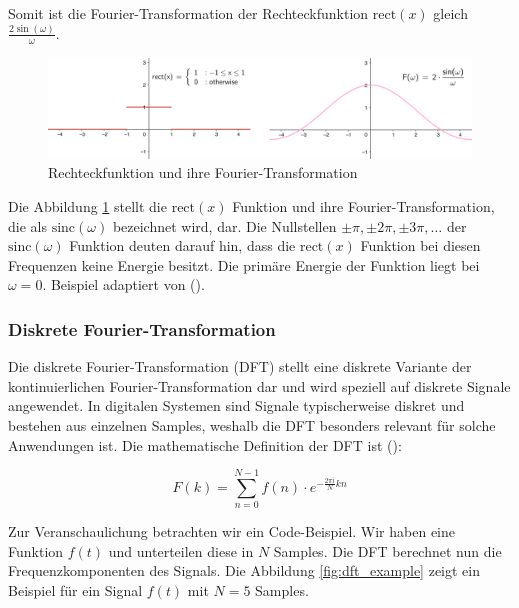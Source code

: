 \documentclass[11pt,a4paper]{article}
\begin{document}
\noindent
\newline
Somit ist die Fourier-Transformation der Rechteckfunktion \( \text{rect}(x) \) gleich
\( \displaystyle\frac{2 \sin(\omega)}{\omega} \).

\begin{figure}[h]
	\centering
	\includegraphics[width=0.8\linewidth]{img/example-fourier-trans.png}
	\caption{Rechteckfunktion und ihre Fourier-Transformation}
	\label{fig:fourier_transform}
\end{figure}

\noindent
Die Abbildung \ref{fig:fourier_transform} stellt die \( \text{rect}(x) \) Funktion und ihre
Fourier-Transformation, die als \( \text{sinc}(\omega) \) bezeichnet wird, dar. Die Nullstellen
\( \pm \pi, \pm 2 \pi, \pm 3 \pi, \dots \) der \( \text{sinc}(\omega) \) Funktion deuten darauf
hin, dass die \( \text{rect}(x) \) Funktion bei diesen Frequenzen keine Energie besitzt. Die
primäre Energie der Funktion liegt bei \( \omega=0 \). Beispiel adaptiert von
(\cite[Chapter~5 - Example~5.1]{hansen2014fourier}).



\subsubsection{Diskrete Fourier-Transformation}

Die diskrete Fourier-Transformation (DFT) stellt eine diskrete Variante der kontinuierlichen
Fourier-Transformation dar und wird speziell auf diskrete Signale angewendet. In digitalen
Systemen sind Signale typischerweise diskret und bestehen aus einzelnen Samples, weshalb die DFT
besonders relevant für solche Anwendungen ist. Die mathematische Definition der DFT ist
(\cite[Chapter~3]{hansen2014fourier}):

\[
	F(k) = \sum_{n=0}^{N-1} f(n) \cdot e^{-\frac{2\pi i}{N} kn}
\]

\noindent
\newline
Zur Veranschaulichung betrachten wir ein Code-Beispiel. Wir haben eine Funktion \(f(t)\) und unterteilen
diese in \(N\) Samples. Die DFT berechnet nun die Frequenzkomponenten des Signals. Die Abbildung
\ref{fig:dft_example} zeigt ein Beispiel für ein Signal \(f(t)\) mit \(N=5\) Samples.
\end{document}
